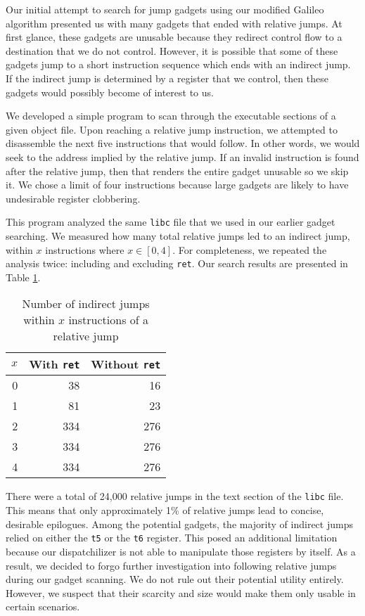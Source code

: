 Our initial attempt to search for jump gadgets using our modified Galileo
algorithm presented us with many gadgets that ended with relative jumps. At first
glance, these gadgets are unusable because they redirect control flow to a
destination that we do not control. However, it is possible that some of these
gadgets jump to a short instruction sequence which ends with an indirect jump.
If the indirect jump is determined by a register that we control, then these
gadgets would possibly become of interest to us.

We developed a simple program to scan through the executable sections of a given
object file. Upon reaching a relative jump instruction, we attempted to
disassemble the next five instructions that would follow. In other words, we
would seek to the address implied by the relative jump. If an invalid 
instruction is found after the relative jump, then that renders the entire 
gadget unusable so we skip it. We chose a limit of four instructions because 
large gadgets are likely to have undesirable register clobbering.

This program analyzed the same \verb|libc| file that we used in our earlier
gadget searching. We measured how many total relative jumps led to an indirect
jump, within $x$ instructions where $x\in[0,4]$. For completeness, we repeated 
the analysis twice: including and excluding \verb|ret|. Our search results are 
presented in Table \ref{table:indjmp}.

\begin{table}
    \caption{Number of indirect jumps within $x$ instructions of a relative jump}
    \label{table:indjmp}
    \begin{center}
        \begin{tabular}{|r|r|r|}
            \hline
            $x$ & With \verb|ret| & Without \verb|ret|\\
            \hline
            0 & 38 & 16 \\
            \hline
            1 & 81 & 23 \\
            \hline
            2 & 334 & 276 \\
            \hline
            3 & 334 & 276 \\
            \hline
            4 & 334 & 276 \\
            \hline
        \end{tabular}
    \end{center}
\end{table}

There were a total of 24,000 relative jumps in the text section of the
\verb|libc| file. This means that only approximately 1\% of relative jumps
lead to concise, desirable epilogues. Among the potential gadgets, the majority
of indirect jumps relied on either the \verb|t5| or the \verb|t6| register. This
posed an additional limitation because our dispatchilizer is not able to
manipulate those registers by itself. As a result, we decided to forgo further
investigation into following relative jumps during our gadget scanning. We do
not rule out their potential utility entirely. However, we suspect that their
scarcity and size would make them only usable in certain scenarios.

